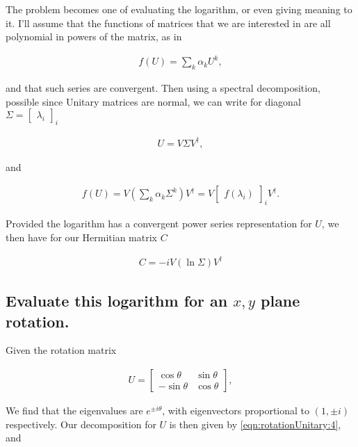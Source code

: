 The problem becomes one of evaluating the logarithm, or even giving meaning to it.  I'll assume that the functions of matrices that we are interested in are all polynomial in powers of the matrix, as in

\begin{align}\label{eqn:rotationUnitary:3}
f(U) = \sum_k \alpha_k U^k,
\end{align}

and that such series are convergent.  Then using a spectral decomposition, possible since Unitary matrices are normal, we can write for diagonal $\Sigma = {\begin{bmatrix} \lambda_i \end{bmatrix}}_i$

\begin{align}\label{eqn:rotationUnitary:4}
U = V \Sigma V^\dagger,
\end{align}

and

\begin{align}\label{eqn:rotationUnitary:3b}
f(U) = V \left( \sum_k \alpha_k \Sigma^k \right) V^\dagger = V {\begin{bmatrix} f(\lambda_i) \end{bmatrix}}_i V^\dagger.
\end{align}

Provided the logarithm has a convergent power series representation for $U$, we then have for our Hermitian matrix $C$

\begin{align}\label{eqn:rotationUnitary:5}
C = -i V (\ln \Sigma) V^\dagger
\end{align}

\subsection{Evaluate this logarithm for an $x,y$ plane rotation.}

Given the rotation matrix

\begin{align}\label{eqn:rotationUnitary:6}
U =
\begin{bmatrix}
\cos\theta & \sin\theta \\
-\sin\theta & \cos\theta
\end{bmatrix},
\end{align}

We find that the eigenvalues are $e^{\pm i\theta}$, with eigenvectors proportional to $(1, \pm i)$ respectively.  Our decomposition for $U$ is then given by
\ref{eqn:rotationUnitary:4}, and

